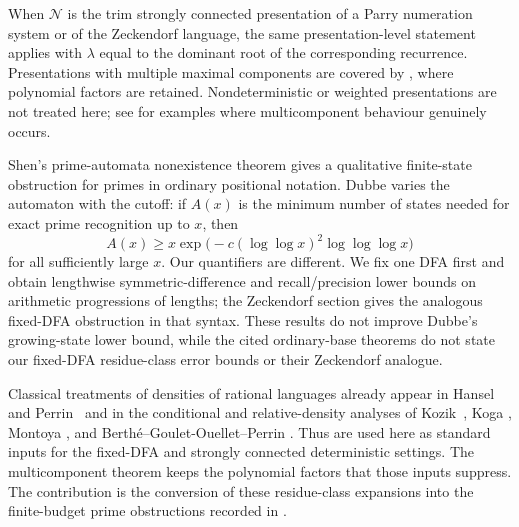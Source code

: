 \begin{remark}
  When \(\mathcal N\) is the trim strongly connected presentation of a
  Parry numeration system or of the Zeckendorf language, the same
  presentation-level statement applies with \(\lambda\) equal to the
  dominant root of the corresponding recurrence. Presentations with
  multiple maximal components are covered by
  , where polynomial factors are
  retained. Nondeterministic or weighted presentations are not treated
  here; see \cite{CharlierRampersadRigoWaxweiler2010} for examples where
  multicomponent behaviour genuinely occurs.
\end{remark}

\begin{remark}
  Shen's prime-automata nonexistence theorem
  \cite{Shen2022} gives a qualitative finite-state obstruction for primes
  in ordinary positional notation. Dubbe \cite[Theorem~1]{Dubbe2024}
  varies the automaton with the cutoff: if \(A(x)\) is the minimum number
  of states needed for exact prime recognition up to \(x\), then
  \[
    A(x)\ge
    x\exp\!\bigl(-c(\log\log x)^2\log\log\log x\bigr)
  \]
  for all sufficiently large \(x\). Our quantifiers are different. We
  fix one DFA first and obtain lengthwise symmetric-difference and
  recall/precision lower bounds on arithmetic progressions of lengths;
  the Zeckendorf section gives the analogous fixed-DFA obstruction in that
  syntax. These results do not improve Dubbe's growing-state lower bound,
  while the cited ordinary-base theorems do not state our fixed-DFA
  residue-class error bounds or their Zeckendorf analogue.
\end{remark}

\begin{remark}
  Classical treatments of densities of rational languages already appear
  in Hansel and Perrin~\cite{HanselPerrin1989} and in the conditional
  and relative-density analyses of Kozik~\cite{Kozik2005Conditional},
  Koga \cite{Koga2019Density}, Montoya \cite{Montoya2025Relative}, and
  Berth\'e--Goulet-Ouellet--Perrin \cite{BertheGouletPerrin2025}.
  Thus  are used here
  as standard inputs for the fixed-DFA and strongly connected
  deterministic settings. The multicomponent theorem keeps the
  polynomial factors that those inputs suppress. The contribution is
  the conversion of these residue-class expansions into the
  finite-budget prime obstructions recorded in
  .
\end{remark}
